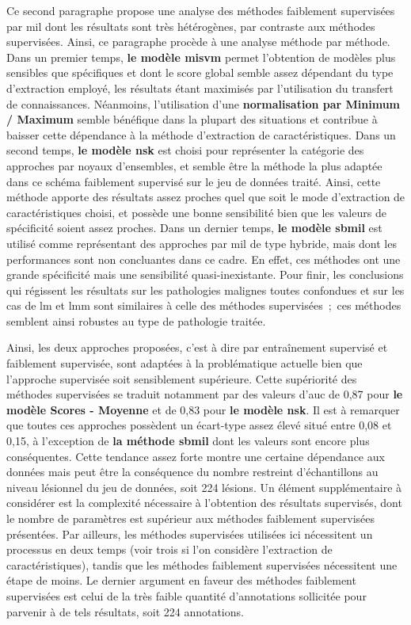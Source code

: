 Ce second paragraphe propose une analyse des méthodes faiblement supervisées par \gls{mil} dont les résultats sont très hétérogènes, par contraste aux méthodes supervisées. Ainsi, ce paragraphe procède à une analyse méthode par méthode. Dans un premier temps, \textbf{le modèle \gls{misvm}} permet l'obtention de modèles plus sensibles que spécifiques et dont le score global semble assez dépendant du type d'extraction employé, les résultats étant maximisés par l'utilisation du transfert de connaissances. Néanmoins, l'utilisation d'une \textbf{normalisation par Minimum / Maximum} semble bénéfique dans la plupart des situations et contribue à baisser cette dépendance à la méthode d'extraction de caractéristiques. Dans un second temps, \textbf{le modèle \gls{nsk}} est choisi pour représenter la catégorie des approches par noyaux d'ensembles, et semble être la méthode la plus adaptée dans ce schéma faiblement supervisé sur le jeu de données traité. Ainsi, cette méthode apporte des résultats assez proches quel que soit le mode d'extraction de caractéristiques choisi, et possède une bonne sensibilité bien que les valeurs de spécificité soient assez proches. Dans un dernier temps, \textbf{le modèle \gls{sbmil}} est utilisé comme représentant des approches par \gls{mil} de type hybride, mais dont les performances sont non concluantes dans ce cadre. En effet, ces méthodes ont une grande spécificité mais une sensibilité quasi-inexistante. Pour finir, les conclusions qui régissent les résultats sur les pathologies malignes toutes confondues et sur les cas de \gls{lm} et \gls{lmm} sont similaires à celle des méthodes supervisées~;~ces méthodes semblent ainsi robustes au type de pathologie traitée.\par

Ainsi, les deux approches proposées, c'est à dire par entraînement supervisé et faiblement supervisée, sont adaptées à la problématique actuelle bien que l'approche supervisée soit sensiblement supérieure. Cette supériorité des méthodes supervisées se traduit notamment par des valeurs d'\gls{auc} de 0,87 pour \textbf{le modèle Scores - Moyenne} et de 0,83 pour \textbf{le modèle \gls{nsk}}. Il est à remarquer que toutes ces approches possèdent un écart-type assez élevé situé entre 0,08 et 0,15, à l'exception de \textbf{la méthode \gls{sbmil}} dont les valeurs sont encore plus conséquentes. Cette tendance assez forte montre une certaine dépendance aux données mais peut être la conséquence du nombre restreint d'échantillons au niveau lésionnel du jeu de données, soit 224 lésions. Un élément supplémentaire à considérer est la complexité nécessaire à l'obtention des résultats supervisés, dont le nombre de paramètres est supérieur aux méthodes faiblement supervisées présentées. Par ailleurs, les méthodes supervisées utilisées ici nécessitent un processus en deux temps (voir trois si l'on considère l'extraction de caractéristiques), tandis que les méthodes faiblement supervisées nécessitent une étape de moins. Le dernier argument en faveur des méthodes faiblement supervisées est celui de la très faible quantité d'annotations sollicitée pour parvenir à de tels résultats, soit 224 annotations.\par

